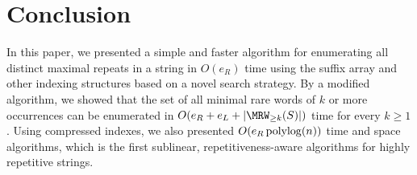 \section{Conclusion}
\label{sec:conc}
In this paper, we presented a simple and faster algorithm
for enumerating all distinct maximal repeats in a string
in $O(e_R)$ time using the suffix array and other indexing structures based on a novel search strategy. By a modified algorithm, we showed that the set of all minimal rare words of $k$ or more occurrences can be enumerated in $O(e_R + e_L + |\MRW_{\ge k}(S)|)$ time for every $k\ge 1$. 
Using compressed indexes, we also presented $O(e_R \operatorname{\mathrm{polylog}}(n))$ time and space algorithms, which is the first sublinear, repetitiveness-aware algorithms for highly repetitive strings.


